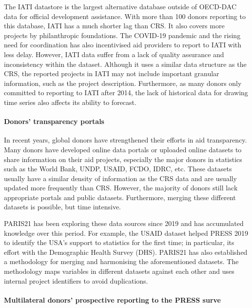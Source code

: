 \documentclass[
]{article}
\begin{document}
The IATI datastore is the largest alternative database outside of OECD‐DAC data for official
development assistance. With more than 100 donors reporting to this database, IATI has a much
shorter lag than CRS. It also covers more projects by philanthropic foundations. The COVID‐19
pandemic and the rising need for coordination has also incentivised aid providers to report to IATI
with less delay. However, IATI data suffer from a lack of quality assurance and inconsistency within
the dataset. Although it uses a similar data structure as the CRS, the reported projects in IATI may not
include important granular information, such as the project description. Furthermore, as many donors
only committed to reporting to IATI after 2014, the lack of historical data for drawing time series also
affects its ability to forecast.

\hypertarget{donors-transparency-portals}{%
\paragraph*{Donors' transparency portals}\label{donors-transparency-portals}}

In recent years, global donors have strengthened their efforts in aid transparency. Many donors have
developed online data portals or uploaded online datasets to share information on their aid projects,
especially the major donors in statistics such as the World Bank, UNDP, USAID, FCDO, IDRC, etc. These
datasets usually have a similar density of information as the CRS data and are usually updated more
frequently than CRS. However, the majority of donors still lack appropriate portals and public datasets.
Furthermore, merging these different datasets is possible, but time intensive.

PARIS21 has been exploring these data sources since 2019 and has accumulated knowledge over this
period. For example, the USAID dataset helped PRESS 2019 to identify the USA's support to statistics
for the first time; in particular, its effort with the Demographic Health Survey (DHS). PARIS21 has also
established a methodology for merging and harmonising the aforementioned datasets. The
methodology maps variables in different datasets against each other and uses internal project
identifiers to avoid duplications.

\hypertarget{multilateral-donors-prospective-reporting-to-the-press-surve}{%
\paragraph*{Multilateral donors' prospective reporting to the PRESS surve}\label{multilateral-donors-prospective-reporting-to-the-press-surve}}
\end{document}
